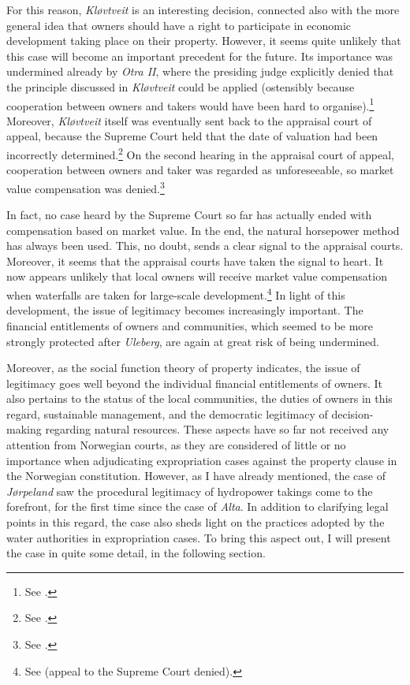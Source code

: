 For this reason, {\it Kløvtveit} is an interesting decision, connected also with the more general idea that owners should have a right to participate in economic development taking place on their property.  However, it seems quite unlikely that this case will become an important precedent for the future. Its importance was undermined already by {\it Otra II}, where the presiding judge explicitly denied that the principle discussed in {\it Kløvtveit} could be applied (ostensibly because cooperation between owners and takers would have been hard to organise).\footnote{See \cite[69-71]{otra13}.} Moreover, {\it Kløvtveit} itself was eventually sent back to the appraisal court of appeal, because the Supreme Court held that the date of valuation had been incorrectly determined.\footnote{See \cite[35-39]{klovtveit11}.} On the second hearing in the appraisal court of appeal, cooperation between owners and taker was regarded as unforeseeable, so market value compensation was denied.\footnote{See \cite{klovtveit13}.}

In fact, no case heard by the Supreme Court so far has actually ended with compensation based on market value. In the end, the natural horsepower method has always been used. This, no doubt, sends a clear signal to the appraisal courts. Moreover, it seems that the appraisal courts have taken the signal to heart. It now appears unlikely that local owners will receive market value compensation when waterfalls are taken for large-scale development.\footnote{See \cite{smibelg15} (appeal to the Supreme Court denied).} In light of this development, the issue of legitimacy becomes increasingly important. The financial entitlements of owners and communities, which seemed to be more strongly protected after {\it Uleberg}, are again at great risk of being undermined. 

Moreover, as the social function theory of property indicates, the issue of legitimacy goes well beyond the individual financial entitlements of owners. It also pertains to the status of the local communities, the duties of owners in this regard, sustainable management, and the democratic legitimacy of decision-making regarding natural resources. These aspects have so far not received any attention from Norwegian courts, as they are considered of little or no importance when adjudicating expropriation cases against the property clause in the Norwegian constitution. However, as I have already mentioned, the case of {\it Jørpeland} saw the procedural legitimacy of hydropower takings come to the forefront, for the first time since the case of {\it Alta}. In addition to clarifying legal points in this regard, the case also sheds light on the practices adopted by the water authorities in expropriation cases. To bring this aspect out, I will present the case in quite some detail, in the following section.

